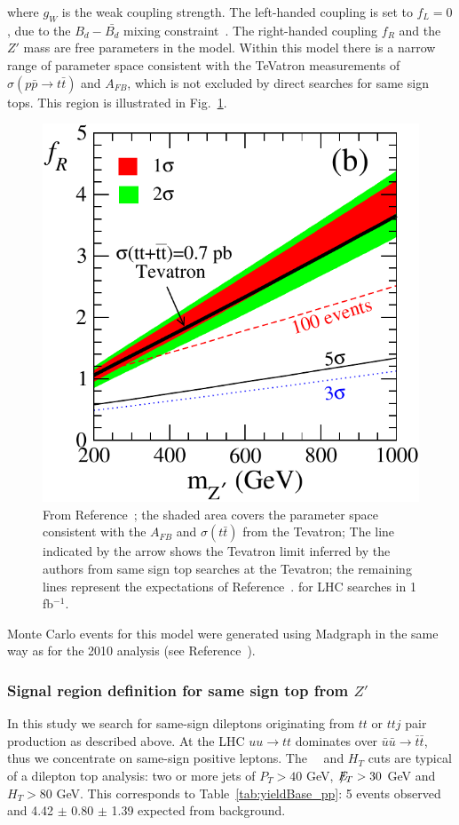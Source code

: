 where $g_W$ is the weak coupling strength. The left-handed coupling is set to $f_L = 0$, due 
to the $B_d-\bar{B_d}$ mixing constraint~\cite{Cao}. 
The right-handed coupling $f_R$ and the $Z'$ mass are free parameters in the model.
Within this model there is a narrow range of parameter space
consistent with the TeVatron measurements of $\sigma(p\bar{p} \to t\bar{t})$ 
and $A_{FB}$, which is not excluded by direct searches for same sign tops.
This region is illustrated in Fig.~\ref{fig:berger_limit}.


\begin{figure}[htb]
\begin{center}
\includegraphics[width=0.4\linewidth]{figs/berger_limit.pdf}
\caption{\protect From Reference~\cite{fcnczprime}; the shaded area covers the parameter
space consistent with the $A_{FB}$ and $\sigma(t\bar{t})$ from the Tevatron;
The line indicated by the arrow shows the Tevatron limit inferred by the authors
from same sign top searches at the Tevatron; the remaining lines represent the
expectations of Reference~\cite{fcnczprime}.
for LHC searches in 1 fb$^{-1}$. \label{fig:berger_limit}}
\end{center}
\end{figure}

Monte Carlo events for this model were generated using Madgraph in the same way as 
for the 2010 analysis (see Reference~\cite{ttAN}).



\subsubsection{Signal region definition for same sign top from $Z'$}
\label{sec:sstopsigdefinition}
In this study we search for same-sign dileptons originating from $tt$ 
or $ttj$ pair production as described above.  At the LHC $uu \to tt$ 
dominates over $\bar{u}\bar{u} \to \bar{t}\bar{t}$, thus we concentrate
on same-sign positive leptons.  The \met~~and $H_T$ cuts are typical 
of a dilepton top analysis: two or more jets of $P_T>40$ GeV, 
$E\!\!\!\!/_T > 30$ GeV and $H_T > 80$ GeV.  This corresponds to Table~\ref{tab:yieldBase_pp}:
5 events observed and 4.42 $\pm$ 0.80 $\pm$ 1.39 expected from background.

